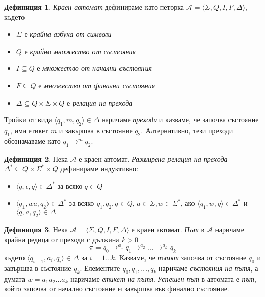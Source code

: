 \documentclass[11pt, oneside]{article}
\theoremstyle{definition}
\newtheorem{definition}{Дефиниция}[section]
\begin{document}
\begin{definition}
	\emph{Краен автомат} дефинираме като петорка \( \mathcal{A} = \langle \Sigma, Q, I, F, \Delta \rangle \), където

	\begin{itemize}
		\item \( \Sigma \) е \emph{крайна азбука от символи}
		\item \( Q \) е \emph{крайно множество от състояния}
		\item \( I \subseteq Q \) е \emph{множество от начални състояния}
		\item \( F \subseteq Q \) е \emph{множество от финални състояния}
		\item \( \Delta \subseteq Q \times \Sigma \times Q \) е \emph{релация на прехода}
	\end{itemize}
 
	Тройки от вида \( \langle q_1, m, q_2 \rangle \in \Delta \) наричаме \emph{преходи} и казваме, че започва състояние \( q_1 \), има етикет \( m \) и завършва в състояние \( q_2 \). Алтернативно, тези преходи обозначаваме като \( q_1 \to^m q_2 \).
\end{definition}

\begin{definition}  
	Нека \( \mathcal{A} \) е краен автомат. \emph{Разширена релация на прехода} \( \Delta^* \subseteq Q \times \Sigma^* \times Q \) дефинираме индуктивно:

	\begin{itemize}
		\item \( \langle q, \epsilon, q \rangle \in \Delta^* \) за всяко \( q \in Q \)
		\item \( \langle q_1, wa, q_2 \rangle \in \Delta^* \) за всяко \( q_1, q_2, q \in Q \), \( a \in \Sigma, w \in \Sigma^* \), ако \( \langle q_1, w, q \rangle \in \Delta^* \) и \( \langle q, a, q_2 \rangle \in \Delta \)
	\end{itemize}
\end{definition}

\begin{definition} 
	Нека \( \mathcal{A} = \langle \Sigma, Q, I, F, \Delta \rangle \) е краен автомат. \emph{Път} в \( \mathcal{A} \) наричаме крайна редица от преходи с дължина \( k > 0 \) 
	\[ \pi = q_0 \to^{a_1} q_1 \to^{a_2} \ldots \to^{a_k} q_k \] 
	където \( \langle q_{i-1}, a_i, q_i \rangle \in \Delta \) за \( i = 1 \ldots k \). Казваме, че \emph{пътят} започва от състояние \( q_0 \) и завършва в състояние \( q_k \). Елементите \( q_0,q_1, \ldots ,q_k \) наричаме \emph{състояния на пътя}, а думата \( w = a_1 a_2 \ldots a_k \) наричаме \emph{етикет на пътя}. \newline \emph{Успешен път} в автомата е \emph{път}, който започва от начално състояние и завършва във финално състояние.
\end{definition}
\end{document}

